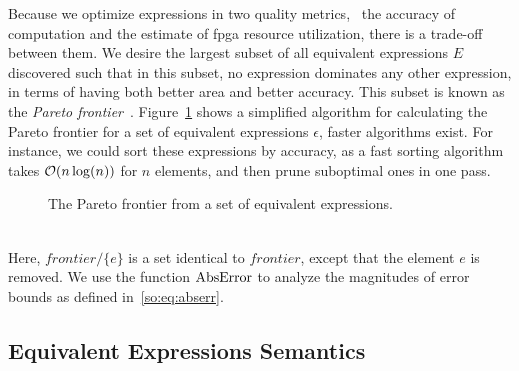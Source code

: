 Because we optimize expressions in two quality metrics, \ie~the accuracy of
computation and the estimate of \gls{fpga} resource utilization, there is
a trade-off between them. We desire the largest subset of all equivalent
expressions $E$ discovered such that in this subset, no expression dominates
any other expression, in terms of having both better area and better
accuracy. This subset is known as the \emph{Pareto frontier}~\cite{legriel10}.
Figure~\ref{so:alg:pareto} shows a simplified algorithm for calculating
the Pareto frontier for a set of equivalent expressions $\epsilon$, faster
algorithms exist.  For instance, we could sort these expressions by accuracy,
as a fast sorting algorithm takes $\operatorname{\mathcal{O}}(n\log(n))$ for $n$ elements, and then
prune suboptimal ones in one pass.
\begin{figure}[ht]
    \centering
    \begin{algorithmic}
        \Function{$\frontier$}{$\epsilon$}
                    \EndIf{}
                \EndFor{}
            \EndFor{}
        \EndFunction%
    \end{algorithmic}
    \caption{The Pareto frontier from a set of equivalent expressions.
    }\label{so:alg:pareto}
\end{figure} \\
Here, $\mathit{frontier} / \{ e \}$ is a set identical to $\mathit{frontier}$,
except that the element $e$ is removed.  We use the function $\operatorname{\mathrm{AbsError}}$ to
analyze the magnitudes of error bounds as defined in~\eqref{so:eq:abserr}.


\subsection{Equivalent Expressions Semantics}

